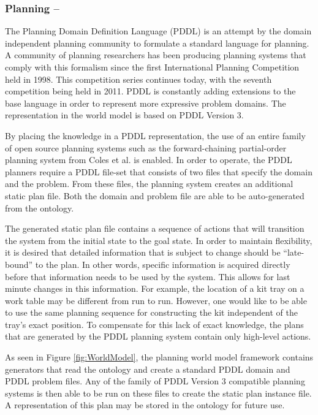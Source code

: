 \subsubsection{Planning --}
The Planning Domain Definition Language (PDDL)  is an attempt by the domain independent planning community to formulate a standard language for planning. A community of planning researchers has been producing planning systems that comply with this formalism since the first International Planning Competition held in 1998. This competition series
continues today, with the seventh competition being held in 2011. PDDL is constantly adding extensions to the base language in order to represent more expressive problem domains. The representation in the world model is based on PDDL Version 3.

By placing the knowledge in a PDDL representation, the use of an entire family of open source planning systems such as the forward-chaining partial-order planning system from Coles et al. \cite{Coles.ICAPS.2010}
is enabled. In order to operate, the PDDL planners require a PDDL file-set that consists of two files that specify the domain and the problem.
From these files, the planning system creates an additional static plan file. Both the domain and problem file are able to be auto-generated from the ontology.

The generated static plan file contains a sequence of actions that will transition the system from the initial state to the goal state. In order to maintain flexibility, it is desired that detailed information that is subject to change should be ``late-bound'' to the plan. In other words, specific information is acquired directly before that information needs to be used by the system. This allows for last minute changes in this information. For example, the location of a kit tray on a work table may be different from run to run. However, one would like to be able to use the same planning sequence for constructing the kit independent of the tray's exact position.
To compensate for this lack of exact knowledge, the plans that are generated by the PDDL planning system contain only high-level actions.

As seen in Figure \ref{fig:WorldModel}, the planning world model framework contains generators that read the ontology and create
a standard PDDL domain and PDDL problem files. Any of the family of PDDL Version 3 compatible planning systems is then able to be
run on these files to create the static plan instance file. A representation of this plan may be stored in the ontology for future use.
%
